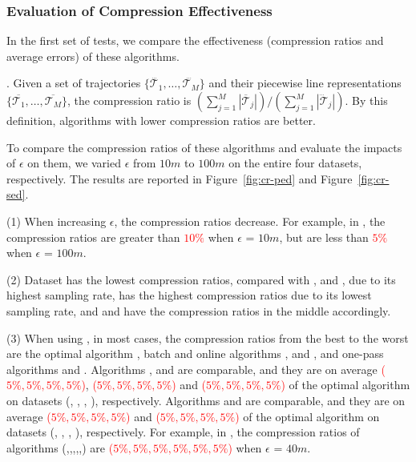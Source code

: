 \subsubsection{Evaluation of Compression Effectiveness}

In the first set of tests, we compare the effectiveness (compression ratios and average errors) of these algorithms.%

. Given a set of trajectories $\{\dddot{\mathcal{T}_1}, \ldots, \dddot{\mathcal{T}_M}\}$ and their piecewise line representations $\{\overline{\mathcal{T}_1}, \ldots, \overline{\mathcal{T}_M}\}$,
the compression ratio is $(\sum_{j=1}^{M} |\overline{\mathcal{T}}_j |)/(\sum_{j=1}^{M} |\dddot{\mathcal{T}}_j |)$.
By this definition, algorithms with lower compression ratios are better.

To compare the compression ratios of these algorithms and evaluate the impacts of $\epsilon$ on them, we varied $\epsilon$ from $10m$ to $100m$ on the entire four datasets, respectively.
The results are reported in Figure~\ref{fig:cr-ped} and Figure~\ref{fig:cr-sed}.


\sstab (1) When increasing $\epsilon$, the compression ratios decrease. For example, in \mopsi,
the compression ratios are greater than \textcolor{red}{$10\%$} when $\epsilon$ = $10m$, but are less than \textcolor{red}{$5\%$} when $\epsilon$ = $100m$.

\sstab (2) Dataset \act has the lowest compression ratios, compared with \ucar, \geolife and \mopsi, due to its highest sampling rate, \ucar has the highest compression ratios due to its lowest sampling rate, and \geolife and \mopsi have the compression ratios in the middle accordingly.

\sstab (3) When using \ped, in most cases, the compression ratios from the best to the worst are the optimal algorithm \optp, batch and online algorithms \tpa, \dpa and \bqsa, and one-pass algorithms \siped and \operb. Algorithms \tpa, \dpa and \bqsa are comparable, and they are on average \textcolor{red}{($5\%,5\%,5\%,5\%$)}, \textcolor{red}{($5\%,5\%,5\%,5\%$)} and \textcolor{red}{($5\%,5\%,5\%,5\%$)} of the optimal algorithm \optp on datasets (\ucar, \geolife, \mopsi, \act), respectively. Algorithms \siped and \operb are comparable, and they are on average \textcolor{red}{($5\%,5\%,5\%,5\%$)} and \textcolor{red}{($5\%,5\%,5\%,5\%$)} of the optimal algorithm \optp on datasets (\ucar, \geolife, \mopsi, \act), respectively.
For example, in \mopsi, the compression ratios of algorithms (\optp,\tpa,\dpa,\bqsa,\siped,\operb ) are \textcolor{red}{($5\%, 5\%,5\%,5\%,5\%,5\%$)} when $\epsilon$ = $40m$.

